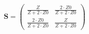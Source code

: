 \[ \mathbf{S}=\left(\begin{array}{cc} \frac{Z}{Z+2\cdot Z0} &
\frac{2\cdot Z0}{Z+2\cdot Z0} \\ \frac{2\cdot Z0}{Z+2\cdot Z0} &
\frac{Z}{Z+2\cdot Z0} \end{array}\right) \]
